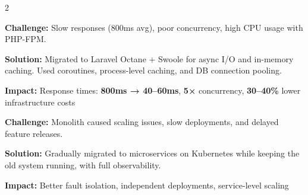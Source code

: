 \documentclass[10pt,a4paper,ragged2e,withhyper]{altacv}
\begin{document}

\begin{paracol}{2}

\medskip


\medskip


\switchcolumn


\medskip


\medskip


\medskip

\end{paracol}

\medskip
{}

{\small\textbf{Challenge:}} Slow responses (800ms avg), poor concurrency, high CPU usage with PHP-FPM.

{\small\textbf{Solution:}} Migrated to Laravel Octane + Swoole for async I/O and in-memory caching. Used coroutines, process-level caching, and DB connection pooling.

{\small\textbf{Impact:}} Response times: \textbf{800ms → 40–60ms}, \textbf{5×} concurrency, \textbf{30–40\%} lower infrastructure costs

\bigskip

{\small\textbf{Challenge:}} Monolith caused scaling issues, slow deployments, and delayed feature releases.

{\small\textbf{Solution:}} Gradually migrated to microservices on Kubernetes while keeping the old system running, with full observability.

{\small\textbf{Impact:}} Better fault isolation, independent deployments, service-level scaling

\bigskip
\end{document}
